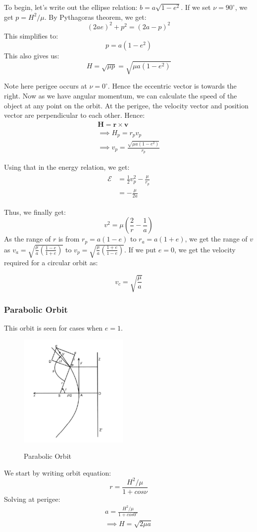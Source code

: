 \documentclass[12pt, letterpaper]{article}
\begin{document}
To begin, let's write out the ellipse relation: $b = a\sqrt{1-e^2}$. If we set $\nu = 90^\circ$, we get $p = H^2/\mu$. By Pythagoras theorem, we get:
\[
	(2ae)^2 + p^2 = (2a -p)^2
\] 
This simplifies to:
\[p=a(1-e^2)\]
This also gives us:
\[H = \sqrt{\mu p} = \sqrt{\mu a(1-e^2)}\]

Note here perigee occurs at $\nu = 0^\circ$. Hence the eccentric vector is towards the right. Now as we have angular momentum, we can calculate the speed of the object at any point on the orbit. At the perigee, the velocity vector and position vector are perpendicular to each other. Hence:
\begin{gather*}
	\mathbf{H} = \mathbf{r\times v}\\
	\implies H_p = r_pv_p\\
	\implies v_p = \frac{\sqrt{\mu a(1-e^2)}}{r_p}
\end{gather*}

Using that in the energy relation, we get:
\begin{gather*}
\begin{split}
	\mathcal{E} &= \frac{1}{2}v_p^2 - \frac{\mu}{r_p}\\
	&= - \frac{\mu}{2a}
\end{split}
\end{gather*}

Thus, we finally get:
\[ v^2  = \mu \left(\frac{2}{r} - \frac{1}{a}\right) \]
As the range of $r$ is from $r_p = a(1-e)$ to $r_a = a(1+e)$, we get the range of $v$ as $v_a = \sqrt{\frac{\mu}{a}\left(\frac{1-e}{1+e}\right)} $ to $v_p =  \sqrt{\frac{\mu}{a}\left(\frac{1+e}{1-e}\right)} $. If we put $e=0$, we get the velocity required for a circular orbit as:

\[ v_c = \sqrt{\frac{\mu}{a}} \]
\newpage
\subsubsection{Parabolic Orbit}
This orbit is seen for cases when $e=1$. 

\begin{figure}[ht]
	\centering
    \includegraphics[width = 200px]{parabola}
    \label{fig:parabola}
    \caption{Parabolic Orbit}
\end{figure}
We start by writing orbit equation:
\[ r = \frac{H^2/\mu}{1+cos\nu} \]
Solving at perigee:
\begin{gather*}
	a = \frac{H^2/\mu}{1+cos0^\circ}\\
	\implies H = \sqrt{2\mu a}
\end{gather*}
\end{document}
